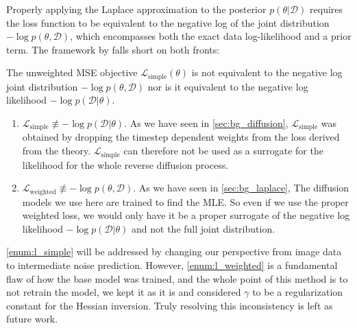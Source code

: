 Properly applying the Laplace approximation to the posterior $p(\theta|\mathcal{D})$ requires the loss function to be equivalent to the negative log of the joint distribution $-\log p(\theta, \mathcal{D})$, which encompasses both the exact data log-likelihood and a prior term. The framework by \cite{jazbec_generative_2025} falls short on both fronts:

The unweighted \acs{MSE} objective $\mathcal{L}_{\mathrm{simple}}(\theta)$ is not equivalent to the negative log joint distribution $-\log p (\theta, \mathcal{D})$ nor is it equivalent to the negative log likelihood $-\log p(\mathcal{D}|\theta)$.

\begin{enumerate}
    \item $\mathcal{L}_{\mathrm{simple}} \not\equiv -\log p(\mathcal{D}|\theta)$. As we have seen in \autoref{sec:bg_diffusion}, $\mathcal{L}_{\mathrm{simple}}$ was obtained by dropping the timestep dependent weights from the loss derived from the theory. $\mathcal{L}_{\mathrm{simple}}$ can therefore not be used as a surrogate for the likelihood for the whole reverse diffusion process. \label{enum:l_simple}
    \item $\mathcal{L}_{\mathrm{weighted}} \not \equiv -\log p(\theta, \mathcal{D})$. As we have seen in \autoref{sec:bg_laplace}, The diffusion models we use here are trained to find the \acs{MLE}. So even if we use the proper weighted loss, we would only have it be a proper surrogate of the negative log likelihood $-\log p(\mathcal{D}|\theta)$ and not the full joint distribution. \label{enum:l_weighted}
\end{enumerate}

\ref{enum:l_simple} will be addressed by changing our perspective from image data to intermediate noise prediction. However, \ref{enum:l_weighted} is a fundamental flaw of how the base model was trained, and the whole point of this method is to not retrain the model, we kept it as it is and considered $\gamma$ to be a regularization constant for the Hessian inversion. Truly resolving this inconsistency is left as future work.


